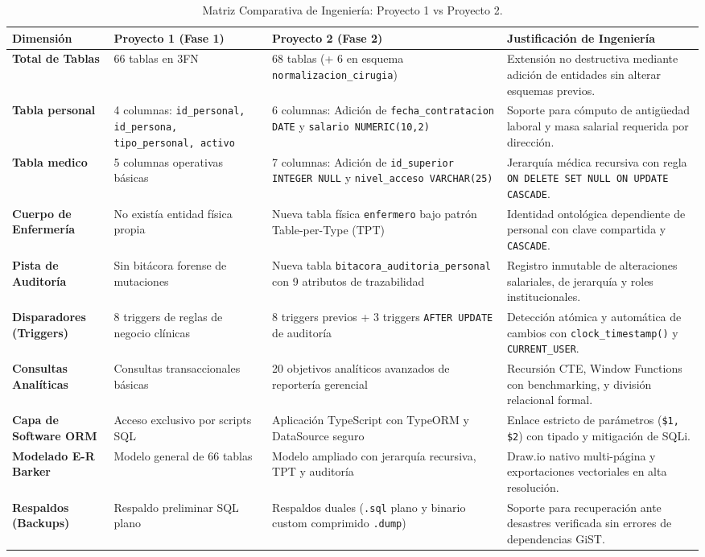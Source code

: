 \documentclass[11pt,a4paper]{article}
\begin{document}
\begin{table}[H]
\centering
\scriptsize
\begin{tabularx}{\linewidth}{|l|X|X|X|}
\hline
\textbf{Dimensión} & \textbf{Proyecto 1 (Fase 1)} & \textbf{Proyecto 2 (Fase 2)} & \textbf{Justificación de Ingeniería} \\
\hline
\textbf{Total de Tablas} & 66 tablas en 3FN & 68 tablas (+ 6 en esquema \texttt{normalizacion\_cirugia}) & Extensión no destructiva mediante adición de entidades sin alterar esquemas previos. \\
\hline
\textbf{Tabla personal} & 4 columnas: \texttt{id\_personal, id\_persona, tipo\_personal, activo} & 6 columnas: Adición de \texttt{fecha\_contratacion DATE} y \texttt{salario NUMERIC(10,2)} & Soporte para cómputo de antigüedad laboral y masa salarial requerida por dirección. \\
\hline
\textbf{Tabla medico} & 5 columnas operativas básicas & 7 columnas: Adición de \texttt{id\_superior INTEGER NULL} y \texttt{nivel\_acceso VARCHAR(25)} & Jerarquía médica recursiva con regla \texttt{ON DELETE SET NULL ON UPDATE CASCADE}. \\
\hline
\textbf{Cuerpo de Enfermería} & No existía entidad física propia & Nueva tabla física \texttt{enfermero} bajo patrón Table-per-Type (TPT) & Identidad ontológica dependiente de personal con clave compartida y \texttt{CASCADE}. \\
\hline
\textbf{Pista de Auditoría} & Sin bitácora forense de mutaciones & Nueva tabla \texttt{bitacora\_auditoria\_personal} con 9 atributos de trazabilidad & Registro inmutable de alteraciones salariales, de jerarquía y roles institucionales. \\
\hline
\textbf{Disparadores (Triggers)} & 8 triggers de reglas de negocio clínicas & 8 triggers previos + 3 triggers \texttt{AFTER UPDATE} de auditoría & Detección atómica y automática de cambios con \texttt{clock\_timestamp()} y \texttt{CURRENT\_USER}. \\
\hline
\textbf{Consultas Analíticas} & Consultas transaccionales básicas & 20 objetivos analíticos avanzados de reportería gerencial & Recursión CTE, Window Functions con benchmarking, y división relacional formal. \\
\hline
\textbf{Capa de Software ORM} & Acceso exclusivo por scripts SQL & Aplicación TypeScript con TypeORM y DataSource seguro & Enlace estricto de parámetros (\texttt{\$1, \$2}) con tipado y mitigación de SQLi. \\
\hline
\textbf{Modelado E-R Barker} & Modelo general de 66 tablas & Modelo ampliado con jerarquía recursiva, TPT y auditoría & Draw.io nativo multi-página y exportaciones vectoriales en alta resolución. \\
\hline
\textbf{Respaldos (Backups)} & Respaldo preliminar SQL plano & Respaldos duales (\texttt{.sql} plano y binario custom comprimido \texttt{.dump}) & Soporte para recuperación ante desastres verificada sin errores de dependencias GiST. \\
\hline
\end{tabularx}
\caption{Matriz Comparativa de Ingeniería: Proyecto 1 vs Proyecto 2.}
\end{table}
\end{document}
